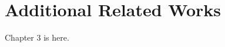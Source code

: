 \documentclass[../main/thesis.tex]{subfiles}
\begin{document}
	
\chapter{Additional Related Works}
Chapter 3 is here.

\bib
\end{document}
